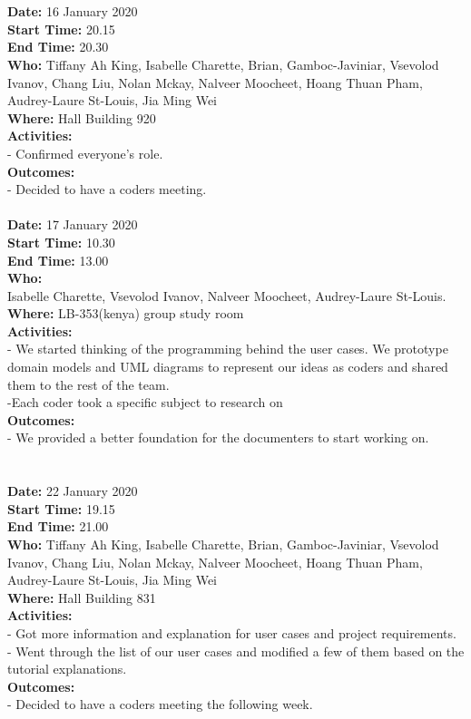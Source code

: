 \documentclass[12pt]{article}
\begin{document}
\\
\\
{\bf Date:} 16 January 2020 \\
{\bf Start Time:} 20.15 \\
{\bf End Time:} 20.30 \\
{\bf Who:} Tiffany Ah King, Isabelle Charette, Brian, Gamboc-Javiniar, Vsevolod Ivanov, Chang Liu, Nolan Mckay, Nalveer Moocheet, Hoang Thuan Pham, Audrey-Laure St-Louis, Jia Ming Wei \\
{\bf Where:} Hall Building 920 \\
{\bf Activities:}\\
- Confirmed everyone's role.\\ 
{\bf Outcomes:}\\
- Decided to have a coders meeting.
\\
\\
{\bf Date:} 17 January 2020 \\
{\bf Start Time:} 10.30 \\
{\bf End Time:} 13.00 \\
{\bf Who:}\\ Isabelle Charette, Vsevolod Ivanov, Nalveer Moocheet, Audrey-Laure St-Louis. \\
{\bf Where:} LB-353(kenya) group study room \\
{\bf Activities:}\\
- We started thinking of the programming behind the user cases. We prototype domain models and UML diagrams to represent our ideas as coders and shared them to the rest of the team.\\
-Each coder took a specific subject to research on\\
{\bf Outcomes:}\\
- We provided a better foundation for the documenters to start working on.\\
\\
\\
{\bf Date:} 22 January 2020 \\
{\bf Start Time:} 19.15 \\
{\bf End Time:} 21.00 \\
{\bf Who:} Tiffany Ah King, Isabelle Charette, Brian, Gamboc-Javiniar, Vsevolod Ivanov, Chang Liu, Nolan Mckay, Nalveer Moocheet, Hoang Thuan Pham, Audrey-Laure St-Louis, Jia Ming Wei \\
{\bf Where:} Hall Building 831 \\
{\bf Activities:}\\
- Got more information and explanation for user cases and project requirements.\\
- Went through the list of our user cases and modified a few of them based on the tutorial explanations.\\
{\bf Outcomes:}\\
- Decided to have a coders meeting the following week.\\
\end{document}
